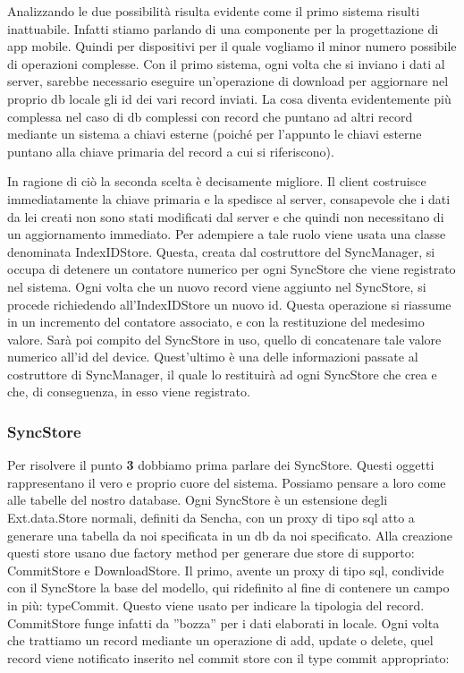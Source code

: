 \documentclass[10pt,a4paper,onecolumn]{article}
\begin{document}
Analizzando le due possibilità risulta evidente come il primo sistema risulti inattuabile. Infatti stiamo parlando di una componente per la progettazione di app mobile. Quindi per dispositivi per il quale vogliamo il minor numero possibile di operazioni complesse. Con il primo sistema, ogni volta che si inviano i dati al server, sarebbe necessario eseguire un'operazione di download per aggiornare nel proprio db locale gli id dei vari record inviati. La cosa diventa evidentemente più complessa nel caso di db complessi con record che puntano ad altri record mediante un sistema a chiavi esterne (poiché per l'appunto le chiavi esterne puntano alla chiave primaria del record a cui si riferiscono).

In ragione di ciò la seconda scelta è decisamente migliore. Il client costruisce immediatamente la chiave primaria e la spedisce al server, consapevole che i dati da lei creati non sono stati modificati dal server e che quindi non necessitano di un aggiornamento immediato. Per adempiere a tale ruolo viene usata una classe denominata IndexIDStore. Questa, creata dal costruttore del SyncManager, si occupa di detenere un contatore numerico per ogni SyncStore che viene registrato nel sistema. Ogni volta che un nuovo record viene aggiunto nel SyncStore, si procede richiedendo all'IndexIDStore un nuovo id. Questa operazione si riassume in un incremento del contatore associato, e con la restituzione del medesimo valore. Sarà poi compito del SyncStore in uso, quello di concatenare tale valore numerico all'id del device. Quest'ultimo è una delle informazioni passate al costruttore di SyncManager, il quale lo restituirà ad ogni SyncStore che crea e che, di conseguenza, in esso viene registrato.

\subsubsection{SyncStore}

Per risolvere il punto \textbf{3} dobbiamo prima parlare dei SyncStore. Questi oggetti rappresentano il vero e proprio cuore del sistema. Possiamo pensare a loro come alle tabelle del nostro database. Ogni SyncStore è un estensione degli Ext.data.Store normali, definiti da Sencha, con un proxy di tipo sql atto a generare una tabella da noi specificata in un db da noi specificato. Alla creazione questi store usano due factory method per generare due store di supporto: CommitStore e DownloadStore. Il primo, avente un proxy di tipo sql, condivide con il SyncStore la base del modello, qui ridefinito al fine di contenere un campo in più: typeCommit. Questo viene usato per indicare la tipologia del record. CommitStore funge infatti da ''bozza'' per i dati elaborati in locale. Ogni volta che trattiamo un record mediante un operazione di add, update o delete, quel record viene notificato inserito nel commit store con il type commit appropriato:
\end{document}
